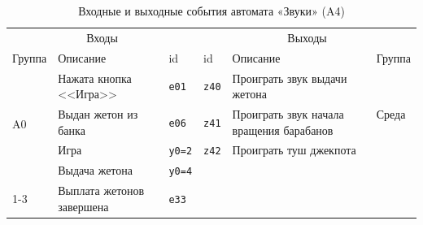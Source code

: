 \begin{table}[H]
\centering
\caption{Входные и выходные события автомата «Звуки» (A4)}
\small
\begin{tabular}{@{}p{1.3cm}p{4.6cm}l|lp{4.6cm}p{1.3cm}@{}}
\toprule
\multicolumn{3}{c}{Входы} & \multicolumn{3}{c}{Выходы} \\
Группа & Описание & id & id & Описание & Группа \\
\midrule
\multirow{4}{*}{A0} & Нажата кнопка <<Игра>> & \texttt{e01} & \texttt{z40} & Проиграть звук выдачи жетона & \multirow{3}{*}{Среда} \\
 & Выдан жетон из банка & \texttt{e06} & \texttt{z41} & Проиграть звук начала вращения барабанов &  \\
 & Игра & \texttt{y0=2} & \texttt{z42} & Проиграть туш джекпота &  \\
\cline{4-6}
 & Выдача жетона & \texttt{y0=4} &  &  &  \\
\cline{1-3}
\multirow{1}{*}{A3} & Выплата жетонов завершена & \texttt{e33} &  &  &  \\
\bottomrule
\end{tabular}
\end{table}